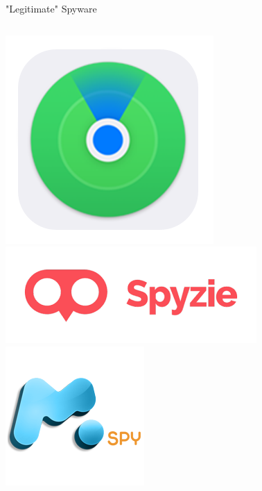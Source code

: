\documentclass[nobackground,dvipsnames,table]{beamer}
\begin{document}
\begin{frame}{"Legitimate" Spyware}
\begin{columns}
            \includegraphics[width=\textwidth]{find-my-phone}
            \includegraphics[width=\textwidth]{spyzie}
            \includegraphics[width=\textwidth]{mspy}
    \end{columns}
\end{frame}
\end{document}
